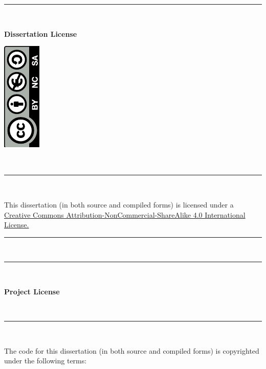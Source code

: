 \documentclass[a4paper, 12pt]{report}
\begin{document}
\begin{titlepage}	
	\rule{\linewidth}{0.5mm} \\[0.1cm]
	\begin{minipage}{0.5\textwidth}
		\Large{\textbf{Dissertation License}}
	\end{minipage}
	\begin{minipage}{0.5\textwidth}
		\begin{flushright}
			\includegraphics[angle=-90]{by-nc-sa}
		\end{flushright}
	\end{minipage}
	\\[0.1cm]
	\rule{\linewidth}{0.5mm} \\[0.1cm]
	\noindent
	\begin{center}
		This dissertation (in both source and compiled forms) is licensed under a\\
		\href{http://creativecommons.org/licenses/by-nc-sa/4.0/}{Creative Commons Attribution-NonCommercial-ShareAlike 4.0 International License.}
	\end{center}	
	\rule{\linewidth}{0.5mm} \\[1.5cm]
	\noindent
	\rule{\linewidth}{0.5mm} \\[0.4cm]
	\begin{minipage}{0.5\textwidth}
		\Large{\textbf{Project License}}
	\end{minipage}
	\begin{minipage}{0.5\textwidth}
		\begin{flushright}
			\Huge{\textcopyright}
		\end{flushright}
	\end{minipage}
	\\[0.1cm]
	\rule{\linewidth}{0.5mm} \\[0.1cm]
	\noindent
	\begin{center}
		The code for this dissertation (in both source and compiled forms) is copyrighted under the following terms:
	\end{center}
	\begin{tcbraster}[raster columns=2,raster rows=1,
		enhanced,size=small,fit algorithm=hybrid* ]

\end{tcbraster}
\end{titlepage}
\end{document}
